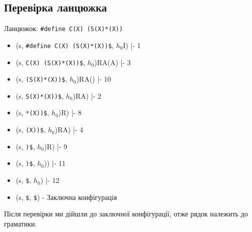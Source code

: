 \subsection{Перевірка ланцюжка}
Ланцюжок: \verb|#define C(X) (S(X)*(X))|

\begin{itemize}
    \item  (s, \verb|#define C(X) (S(X)*(X))$|, $h_{0}$I) |- 1
    \item  (s, \verb|C(X) (S(X)*(X))$|, $h_{0}$)RA(A) |- 3
    \item  (s, \verb|(S(X)*(X))$|, $h_{0}$)RA() |- 10
    \item  (s, \verb|S(X)*(X))$|, $h_{0}$)RA) |- 2
    \item  (s, \verb|*(X))$|, $h_{0}$)R) |- 8
    \item  (s, \verb|(X))$|, $h_{0}$)RA) |- 4
    \item  (s, \verb|)$|, $h_{0}$)R) |- 9
    \item  (s, \verb|)$|, $h_{0}$)) |- 11
    \item  (s, \verb|$|, $h_{0}$) |- 12
    \item  (s, \verb|$|, \verb|$|) - Заключна конфігурація
\end{itemize}

Після перевірки ми дійшли до заключної конфігурації, отже рядок належить до граматики.


